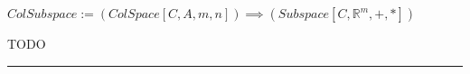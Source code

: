 \documentclass{book}
\newcommand{\abr}{:=}
\newcommand{\pr}[1]{\left(#1\right)}
\begin{document}
$ColSubspace \abr (ColSpace[C, A, m, n]) \implies (Subspace[C, \mathbb{R}^m, +, *])$
\begin{enumerate}
  \lit TODO
\end{enumerate} \vspace{.75mm} \hrule \vspace{.75mm} \ \\

\begin{comment}
  $SetSum[A + B, A, B, V, +, *] \abr (VectorSpace[V, +, *]) \land (A, B \subseteq V) \land \pr{A + B = \{a + b | (a \in A) \land (b \in B)\}}$ \\

  $DirSum[A \oplus B, A, B, V, +, *] \abr \left(\begin{array}{ll}
    (Subspace[A, V, +, *]) \hfill \land \hfill (Subspace[B, V, +, *]) \hfill \land \hfill \\
    (SetSum[A + B, A, B, V, +, *]) \hfill \land \hfill \pr{\forall_{s \in A + B} \exists!_{\langle a, b \rangle \in A \times B}(s = a + b)}
  \end{array}\right)$ \\


\end{comment}
\end{document}
